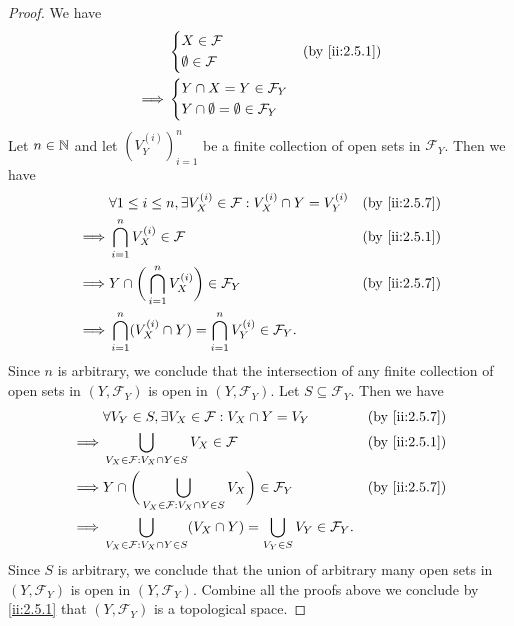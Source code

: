\begin{proof}
  We have
  \begin{align*}
             & \begin{dcases}
                 X \in \mathcal{F} \\
                 \emptyset \in \mathcal{F}
               \end{dcases}                      &  & \by{ii:2.5.1} \\
    \implies & \begin{dcases}
                 Y \cap X = Y \in \mathcal{F}_Y \\
                 Y \cap \emptyset = \emptyset \in \mathcal{F}_Y
               \end{dcases}
  \end{align*}
  Let \(n \in \mathbb{N}\) and let \((V_Y^{(i)})_{i = 1}^n\) be a finite collection of open sets in \(\mathcal{F}_Y\).
  Then we have
  \begin{align*}
             & \forall 1 \leq i \leq n, \exists V_X^{(i)} \in \mathcal{F} : V_X^{(i)} \cap Y = V_Y^{(i)} &  & \by{ii:2.5.7} \\
    \implies & \bigcap_{i = 1}^n V_X^{(i)} \in \mathcal{F}                                               &  & \by{ii:2.5.1} \\
    \implies & Y \cap \bigg(\bigcap_{i = 1}^n V_X^{(i)}\bigg) \in \mathcal{F}_Y                          &  & \by{ii:2.5.7} \\
    \implies & \bigcap_{i = 1}^n (V_X^{(i)} \cap Y) = \bigcap_{i = 1}^n V_Y^{(i)} \in \mathcal{F}_Y.
  \end{align*}
  Since \(n\) is arbitrary, we conclude that the intersection of any finite collection of open sets in \((Y, \mathcal{F}_Y)\) is open in \((Y, \mathcal{F}_Y)\).
  Let \(S \subseteq \mathcal{F}_Y\).
  Then we have
  \begin{align*}
             & \forall V_Y \in S, \exists V_X \in \mathcal{F} : V_X \cap Y = V_Y                                          &  & \by{ii:2.5.7} \\
    \implies & \bigcup_{V_X \in \mathcal{F} : V_X \cap Y \in S} V_X \in \mathcal{F}                                       &  & \by{ii:2.5.1} \\
    \implies & Y \cap \bigg(\bigcup_{V_X \in \mathcal{F} : V_X \cap Y \in S} V_X\bigg) \in \mathcal{F}_Y                  &  & \by{ii:2.5.7} \\
    \implies & \bigcup_{V_X \in \mathcal{F} : V_X \cap Y \in S} (V_X \cap Y) = \bigcup_{V_Y \in S} V_Y \in \mathcal{F}_Y.
  \end{align*}
  Since \(S\) is arbitrary, we conclude that the union of arbitrary many open sets in \((Y, \mathcal{F}_Y)\) is open in \((Y, \mathcal{F}_Y)\).
  Combine all the proofs above we conclude by \cref{ii:2.5.1} that \((Y, \mathcal{F}_Y)\) is a topological space.
\end{proof}

